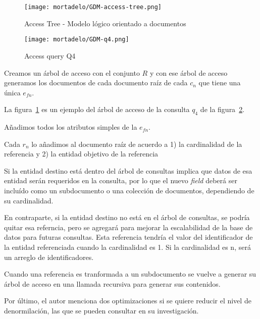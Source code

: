 \begin{figure}[h!t] 
    \centering
    \texttt{[image: mortadelo/GDM-access-tree.png]}
    \caption{Access Tree - Modelo lógico orientado a documentos}
    \label{img:mortadelo-gdm-logical-model-access-tree}
\end{figure}

\begin{figure}[h!t] 
    \centering
    \texttt{[image: mortadelo/GDM-q4.png]}
    \caption{Access query Q4}
    \label{img:mortadelo-gdm-logical-model-q4}
\end{figure}

Creamos un árbol de acceso con el conjunto $R$ y con ese árbol de acceso generamos los documentos de cada documento raíz de cada $c_{n}$ que tiene una única $e_{fn}$. 


La figura~\ref{img:mortadelo-gdm-logical-model-access-tree} es un ejemplo del árbol de acceso de la consulta $q_{4}$ de la figura~\ref{img:mortadelo-gdm-logical-model-q4}.


Añadimos todos los atributos simples de la $e_{fn}$.


Cada $r_{n}$ lo añadimos al documento raíz de acuerdo a 1) la cardinalidad de la referencia y 2) la entidad objetivo de la referencia


Si la entidad destino está dentro del árbol de consultas implica que datos de esa entidad serán requeridos en la consulta, por lo que el nuevo \textit{field} deberá ser incluído como un subdocumento o una colección de documentos, dependiendo de su cardinalidad.

En contraparte, si la entidad destino no está en el árbol de consultas, se podría quitar esa referncia, pero se agregará para mejorar la escalabilidad de la base de datos para futuras consultas. Esta referencia tendría el valor del identificador de la entidad referenciada cuando la cardinalidad es 1. Si la cardinalidad es n, será un arreglo de identificadores.


Cuando una referencia es tranformada a un subdocumento se vuelve a generar su árbol de acceso en una llamada recursiva para generar sus contenidos.


Por último, el autor menciona dos optimizaciones si se quiere reducir el nivel de denormilación, las que se pueden consultar en su investigación\cite{de_la_vega_mortadelo_2020}.

